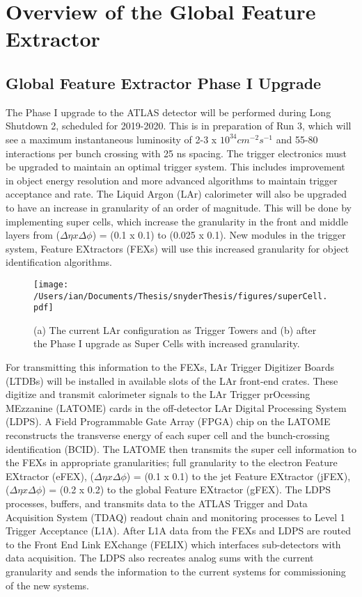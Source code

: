 \chapter{Overview of the Global Feature Extractor}
\label{ch:gFEX}


\section{Global Feature Extractor Phase I Upgrade}

The Phase I upgrade to the ATLAS detector will be performed during Long Shutdown 2, scheduled for 2019-2020.  This is in preparation of Run 3, which will see a maximum instantaneous luminosity of 2-3 x $10^{34} cm^{-2} s^{-1}$ and 55-80 interactions per bunch crossing with 25 ns spacing.  The trigger electronics must be upgraded to maintain an optimal trigger system.  This includes improvement in object energy resolution and more advanced algorithms to maintain trigger acceptance and rate.  The Liquid Argon (LAr) calorimeter will also be upgraded to have an increase in granularity of an order of magnitude.  This will be done by implementing super cells, which increase the granularity in the front and middle layers from ($\Delta \eta x \Delta \phi $) = (0.1 x 0.1) to (0.025 x 0.1).  New modules in the trigger system, Feature EXtractors (FEXs) will use this increased granularity for object identification algorithms. \\

\begin{figure} [h!]
\texttt{[image: /Users/ian/Documents/Thesis/snyderThesis/figures/superCell.pdf]} 
\caption{(a) The current LAr configuration as Trigger Towers and (b) after the Phase I upgrade as Super Cells with increased granularity. }
\end{figure}

For transmitting this information to the FEXs, LAr Trigger Digitizer Boards (LTDBs) will be installed in available slots of the LAr front-end crates.  These digitize and transmit calorimeter signals to the LAr Trigger prOcessing MEzzanine (LATOME) cards in the off-detector LAr Digital Processing System (LDPS).  A Field Programmable Gate Array (FPGA) chip on the LATOME  reconstructs the transverse energy of each super cell and the bunch-crossing identification (BCID).  The LATOME then transmits the super cell information to the FEXs in appropriate granularities; full granularity to the electron Feature EXtractor (eFEX), ($\Delta \eta x \Delta \phi $) = (0.1 x 0.1) to the jet Feature EXtractor (jFEX), ($\Delta \eta x \Delta \phi $) = (0.2 x 0.2) to the global Feature EXtractor (gFEX).  The LDPS processes, buffers, and transmits data to the ATLAS Trigger and Data Acquisition System (TDAQ) readout chain and monitoring processes to Level 1 Trigger Acceptance (L1A).  After L1A data from the FEXs and LDPS are routed to the Front End Link EXchange (FELIX) which interfaces sub-detectors with data acquisition.  The LDPS also recreates analog sums with the current granularity and sends the information to the current systems for commissioning of the new systems. \\

